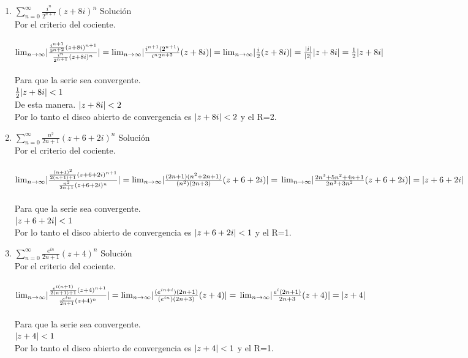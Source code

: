 \begin{enumerate}
\item $\sum\limits_{n=0}^\infty\frac{i^n}{2^{n+1}}(z+8i)^n$
Soluci\'on\\
Por el criterio del cociente.\\ \\
$\lim_{n \to \infty}\lvert\frac{\frac{i^{n+1}}{2^{n+2}}(z+8i)^{n+1}}{\frac{i^n}{2^{n+1}}(z+8i)^n}\rvert= \lim_{n \to \infty}\lvert\frac{i^{n+1}(2^{n+1})}{i^{n}2^{n+2}}(z+8i)\rvert= \lim_{n \to \infty}\lvert\frac{i}{2}(z+8i)\rvert=\frac{|i|}{|2|}\lvert z+8i\rvert=\frac{1}{2}|z+8i|$\\ \\
Para que la serie sea convergente.\\
$\frac{1}{2}\lvert z+8i\rvert < 1$\\ 
De esta manera.
$\lvert z+8i\rvert < 2$\\
Por lo tanto el disco abierto de convergencia es $\lvert z+8i\rvert < 2$ y el R=2.

\item $\sum\limits_{n=0}^\infty\frac{n^2}{2n+1}(z+6+2i)^n$
Soluci\'on\\
Por el criterio del cociente.\\ \\
$\lim_{n \to \infty}\lvert\frac{\frac{(n+1)^2}{2(n+1)+1}(z+6+2i)^{n+1}}{\frac{n^2}{2n+1}(z+6+2i)^n}\rvert= \lim_{n \to \infty}\lvert\frac{(2n+1)(n^2+2n+1)}{(n^2)(2n+3)}(z+6+2i)\rvert= \\ \lim_{n \to \infty}\lvert\frac{2n^3+5n^2+4n+1}{2n^3+3n^2}(z+6+2i)\rvert=\lvert z+6+2i\rvert$\\ \\
Para que la serie sea convergente.\\
$\lvert z+6+2i\rvert < 1$\\ 
Por lo tanto el disco abierto de convergencia es $\lvert z+6+2i\rvert < 1$ y el R=1.

\item $\sum\limits_{n=0}^\infty\frac{e^{in}}{2n+1}(z+4)^n$
Soluci\'on\\
Por el criterio del cociente.\\ \\
$\lim_{n \to \infty}\lvert\frac{\frac{e^{i(n+1)}}{2(n+1)+1}(z+4)^{n+1}}{\frac{e^{in}}{2n+1}(z+4)^n}\rvert= \lim_{n \to \infty}\lvert\frac{(e^{in+i})(2n+1)}{(e^{in})(2n+3)}(z+4)\rvert= \\ \lim_{n \to \infty}\lvert\frac{e^i(2n+1)}{2n+3}(z+4)\rvert=\lvert z+4\rvert$\\ \\
Para que la serie sea convergente.\\
$\lvert z+4\rvert < 1$\\ 
Por lo tanto el disco abierto de convergencia es $\lvert z+4\rvert < 1$ y el R=1.


\end{enumerate}
